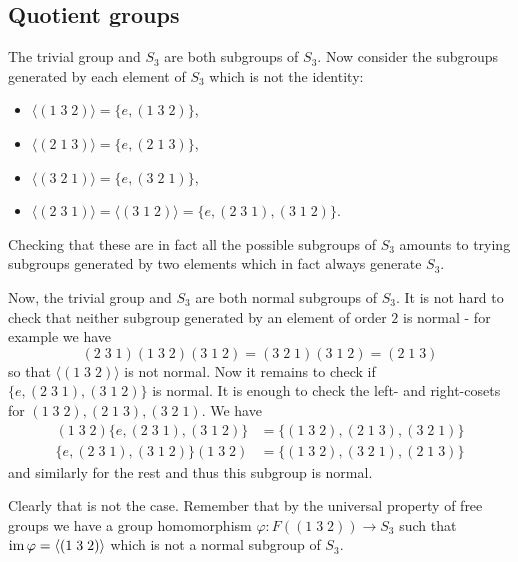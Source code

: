 \subsection{Quotient groups}

\begin{problem}
\end{problem}

\begin{solution}
	The trivial group and $S_3$ are both subgroups of $S_3$. Now consider the subgroups generated by each element of $S_3$ which is not the identity:
	\begin{itemize}
		\item $\langle (1\;3\;2) \rangle = \{e, (1\; 3\; 2)\}$,
		\item $\langle (2\;1\;3) \rangle = \{e, (2\; 1\; 3)\}$,
		\item $\langle (3\;2\;1) \rangle = \{e, (3\; 2\; 1)\}$,
		\item $\langle (2\;3\;1) \rangle = \langle (3\;1\;2) \rangle = \{e, (2\; 3\; 1), (3\; 1\; 2)\}$.
	\end{itemize}
	Checking that these are in fact all the possible subgroups of $S_3$ amounts to trying subgroups generated by two elements which in fact always generate $S_3$.
	
	Now, the trivial group and $S_3$ are both normal subgroups of $S_3$. It is not hard to check that neither subgroup generated by an element of order $2$ is normal - for example we have
	\[
		(2\;3\;1)(1\;3\;2)(3\;1\;2) = (3\;2\;1)(3\;1\;2) = (2\;1\;3)
	\]
	so that $\langle (1\;3\;2) \rangle$ is not normal.
	Now it remains to check if $\{e, (2\; 3\; 1), (3\; 1\; 2)\}$ is normal. It is enough to check the left- and right-cosets for $(1\;3\;2), (2\;1\;3), (3\;2\;1)$. We have
	\begin{align*}
		(1\;3\;2) \{e, (2\; 3\; 1), (3\; 1\; 2)\} &= \{ (1\; 3\; 2), (2\; 1\; 3), (3\; 2\; 1) \} \\
		\{e, (2\; 3\; 1), (3\; 1\; 2)\} (1\; 3\; 2) &= \{ (1\; 3\; 2), (3\; 2\; 1), (2\; 1\; 3) \}
	\end{align*}
	and similarly for the rest and thus this subgroup is normal.
\end{solution}

\begin{problem}
\end{problem}

\begin{solution}
	Clearly that is not the case. Remember that by the universal property of free groups we have a group homomorphism $\varphi: F((1\;3\;2)) \to S_3$ such that $\operatorname{im} \varphi = \langle (1\;3\;2) \rangle$ which is not a normal subgroup of $S_3$.
\end{solution}

